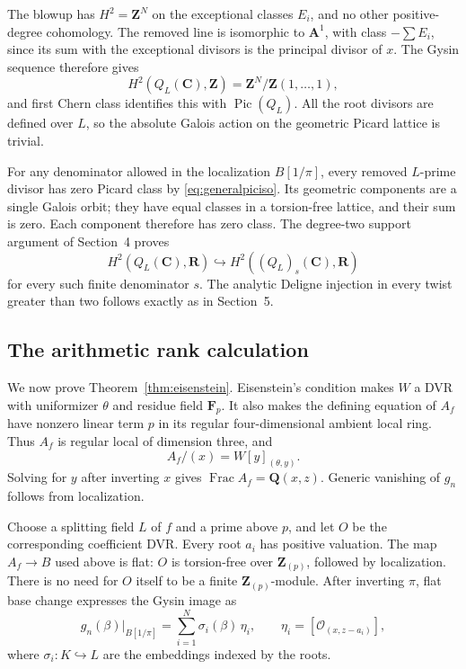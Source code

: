 \documentclass[11pt,a4paper]{article}
\theoremstyle{remark}
\newcommand{\Q}{\mathbf Q}
\newcommand{\Z}{\mathbf Z}
\newcommand{\R}{\mathbf R}
\newcommand{\C}{\mathbf C}
\newcommand{\F}{\mathbf F}
\newcommand{\A}{\mathbf A}
\newcommand{\OO}{\mathcal O}
\newcommand{\Pic}{\operatorname{Pic}}
\newcommand{\Frac}{\operatorname{Frac}}
\begin{document}
The blowup has $H^2=\Z^N$ on the exceptional classes $E_i$, and no other positive-degree cohomology. The removed line is isomorphic to $\A^1$, with class $-\sum E_i$, since its sum with the exceptional divisors is the principal divisor of $x$. The Gysin sequence therefore gives
\[
H^2(Q_L(\C),\Z)=\Z^N/\Z(1,\ldots,1),
\]
and first Chern class identifies this with $\Pic(Q_L)$. All the root divisors are defined over $L$, so the absolute Galois action on the geometric Picard lattice is trivial.

For any denominator allowed in the localization $B[1/\pi]$, every removed $L$-prime divisor has zero Picard class by \eqref{eq:generalpiciso}. Its geometric components are a single Galois orbit; they have equal classes in a torsion-free lattice, and their sum is zero. Each component therefore has zero class. The degree-two support argument of Section~4 proves
\[
H^2(Q_L(\C),\R)\hookrightarrow H^2((Q_L)_s(\C),\R)
\]
for every such finite denominator $s$. The analytic Deligne injection in every twist greater than two follows exactly as in Section~5.

\subsection{The arithmetic rank calculation}

We now prove Theorem~\ref{thm:eisenstein}. Eisenstein's condition makes $W$ a DVR with uniformizer $\theta$ and residue field $\F_p$. It also makes the defining equation of $A_f$ have nonzero linear term $p$ in its regular four-dimensional ambient local ring. Thus $A_f$ is regular local of dimension three, and
\[
A_f/(x)=W[y]_{(\theta,y)}.
\]
Solving for $y$ after inverting $x$ gives $\Frac A_f=\Q(x,z)$. Generic vanishing of $g_n$ follows from localization.

Choose a splitting field $L$ of $f$ and a prime above $p$, and let $O$ be the corresponding coefficient DVR. Every root $a_i$ has positive valuation. The map $A_f\to B$ used above is flat: $O$ is torsion-free over $\Z_{(p)}$, followed by localization. There is no need for $O$ itself to be a finite $\Z_{(p)}$-module. After inverting $\pi$, flat base change expresses the Gysin image as
\begin{equation}\label{eq:generalbasechange}
g_n(\beta)|_{B[1/\pi]}=
\sum_{i=1}^N \sigma_i(\beta)\,\eta_i,
\qquad \eta_i=[\OO_{(x,z-a_i)}],
\end{equation}
where $\sigma_i:K\hookrightarrow L$ are the embeddings indexed by the roots.
\end{document}
